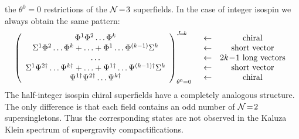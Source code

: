 \documentclass[a4paper,12pt]{article}
\begin{document}
the $\theta^0\!=\!0$ restrictions of the ${\cal N}\!=\!3$ superfields.
In the case of integer isospin we always obtain the same pattern:
\begin{equation}
\left(\begin{array}{c}
\Phi^1\Phi^2\ldots\Phi^k\\
\Sigma^1\Phi^2\ldots\Phi^k+\ldots+
\Phi^1\ldots\Phi^{(k-1)}\Sigma^k\\
\ldots\\
\Sigma^1\Psi^{2\dagger}\ldots\Psi^{k\dagger}+\ldots+
\Psi^{1\dagger}\ldots\Psi^{(k-1)\dagger}\Sigma^k\\
\Psi^{1\dagger}\Psi^{2\dagger}\ldots\Psi^{k\dagger}
\end{array}\right)^{J\!=\!k}_{\theta^0=0}\ \
\left.\begin{array}{cc}
\leftarrow&{\rm chiral}\\
\leftarrow&{\rm short\ vector}\\
\leftarrow&2k\!-\!1\ {\rm long\ vectors}\\
\leftarrow&{\rm short\ vector}\\
\leftarrow&{\rm chiral}\\
\end{array}\right.
\end{equation}
The half-integer isospin chiral superfields have a completely
analogous structure.
The only difference is that each field contains an odd number of
${\cal N}\!=\!2$ supersingletons.
Thus the corresponding states are not observed in the Kaluza Klein
spectrum of supergravity compactifications.
\end{document}
